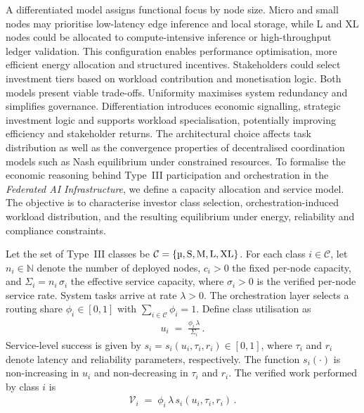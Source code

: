 \documentclass[oneside,10pt]{swissi}
\begin{document}
A differentiated model assigns functional focus by node size. Micro and small nodes may prioritise low-latency edge inference and local storage, while L and XL nodes could be allocated to compute-intensive inference or high-throughput ledger validation. This configuration enables performance optimisation, more efficient energy allocation and structured incentives. Stakeholders could select investment tiers based on workload contribution and monetisation logic. Both models present viable trade-offs. Uniformity maximises system redundancy and simplifies governance. Differentiation introduces economic signalling, strategic investment logic and supports workload specialisation, potentially improving efficiency and stakeholder returns. The architectural choice affects task distribution as well as the convergence properties of decentralised coordination models such as Nash equilibrium under constrained resources. To formalise the economic reasoning behind Type~III participation and orchestration in the \textit{Federated AI Infrastructure}, we define a capacity allocation and service model. The objective is to characterise investor class selection, orchestration-induced workload distribution, and the resulting equilibrium under energy, reliability and compliance constraints.

Let the set of Type~III classes be \(\mathcal{C} = \{\text{\textmu}, \mathrm{S}, \mathrm{M}, \mathrm{L}, \mathrm{XL}\}\). For each class \(i \in \mathcal{C}\), let \(n_i \in \mathbb{N}\) denote the number of deployed nodes, \(c_i > 0\) the fixed per-node capacity, and \(\Sigma_i = n_i\,\sigma_i\) the effective service capacity, where \(\sigma_i > 0\) is the verified per-node service rate. System tasks arrive at rate \(\lambda > 0\). The orchestration layer selects a routing share \(\phi_i \in [0,1]\) with \(\sum_{i \in \mathcal{C}} \phi_i = 1\). Define class utilisation as
\begin{align}
u_i \;=\; \frac{\phi_i\,\lambda}{\Sigma_i}\,.
\label{eq:utilisation}
\end{align}
Service-level success is given by \(s_i = s_i(u_i, \tau_i, r_i) \in [0,1]\), where \(\tau_i\) and \(r_i\) denote latency and reliability parameters, respectively. The function \(s_i(\cdot)\) is non-increasing in \(u_i\) and non-decreasing in \(\tau_i\) and \(r_i\). The verified work performed by class \(i\) is
\begin{align}
\mathcal{V}_i \;=\; \phi_i\,\lambda\, s_i(u_i, \tau_i, r_i)\,.
\label{eq:verified-work}
\end{align}
\end{document}

